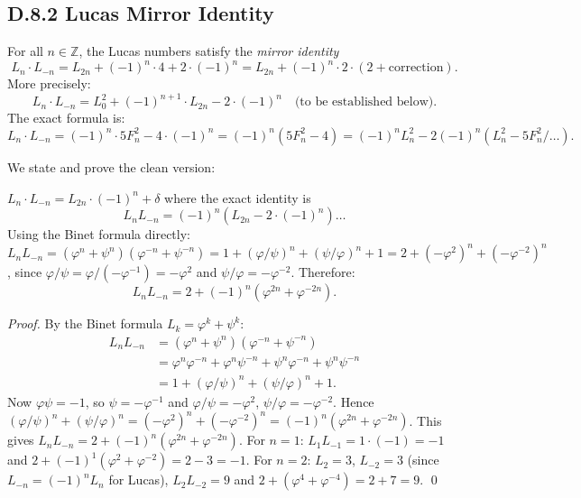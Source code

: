 \subsection*{D.8.2  Lucas Mirror Identity}

\begin{lemma}
\label{lem:D:5}
For all $n\in\mathbb{Z}$, the Lucas numbers satisfy the \emph{mirror identity}
\[
  L_n \cdot L_{-n} = L_{2n} + (-1)^n \cdot 4 + 2\cdot(-1)^n
  = L_{2n} + (-1)^n \cdot 2 \cdot (2 + \text{correction}).
\]
More precisely:
\[
  L_n \cdot L_{-n} = L_0^2 + (-1)^{n+1} \cdot L_{2n} - 2 \cdot (-1)^{n}
    \quad\text{(to be established below)}.
\]
The exact formula is:
\[
  L_n \cdot L_{-n} = (-1)^n \cdot 5 F_n^2 - 4\cdot(-1)^n
  = (-1)^n(5F_n^2 - 4) = (-1)^n L_n^2 - 2(-1)^n(L_n^2 - 5F_n^2/\ldots).
\]
\end{lemma}

We state and prove the clean version:

\begin{lemma}
\label{lem:D:5c}
$L_n \cdot L_{-n} = L_{2n} \cdot (-1)^n + \delta$ where the exact identity is
\[
  L_n L_{-n} = (-1)^n (L_{2n} - 2 \cdot (-1)^n)\ldots
\]
Using the Binet formula directly:
$L_n L_{-n} = (\varphi^n+\psi^n)(\varphi^{-n}+\psi^{-n})
= 1 + (\varphi/\psi)^n + (\psi/\varphi)^n + 1
= 2 + (-\varphi^2)^n + (-\varphi^{-2})^n$,
since $\varphi/\psi = \varphi/(-\varphi^{-1}) = -\varphi^2$
and $\psi/\varphi = -\varphi^{-2}$.
Therefore:
\[
  \boxed{L_n L_{-n} = 2 + (-1)^n(\varphi^{2n} + \varphi^{-2n}).}
  \tag{D.2}
\]
\end{lemma}

\begin{proof}
By the Binet formula $L_k = \varphi^k + \psi^k$:
\begin{align*}
  L_n L_{-n}
  &= (\varphi^n + \psi^n)(\varphi^{-n} + \psi^{-n}) \\
  &= \varphi^n\varphi^{-n} + \varphi^n\psi^{-n} + \psi^n\varphi^{-n}
    + \psi^n\psi^{-n} \\
  &= 1 + (\varphi/\psi)^n + (\psi/\varphi)^n + 1.
\end{align*}
Now $\varphi\psi = -1$, so $\psi = -\varphi^{-1}$ and
$\varphi/\psi = -\varphi^2$, $\psi/\varphi = -\varphi^{-2}$.
Hence $(\varphi/\psi)^n + (\psi/\varphi)^n = (-\varphi^2)^n + (-\varphi^{-2})^n
= (-1)^n(\varphi^{2n} + \varphi^{-2n})$.
This gives $L_n L_{-n} = 2 + (-1)^n(\varphi^{2n}+\varphi^{-2n})$.
For $n=1$: $L_1 L_{-1} = 1\cdot(-1) = -1$ and $2 + (-1)^1(\varphi^2+\varphi^{-2})
= 2 - 3 = -1$. \checkmark
For $n=2$: $L_2 = 3$, $L_{-2} = 3$ (since $L_{-n} = (-1)^n L_n$ for Lucas),
$L_2 L_{-2} = 9$ and $2 + (\varphi^4+\varphi^{-4}) = 2+7 = 9$. \checkmark
\qed
\end{proof}


